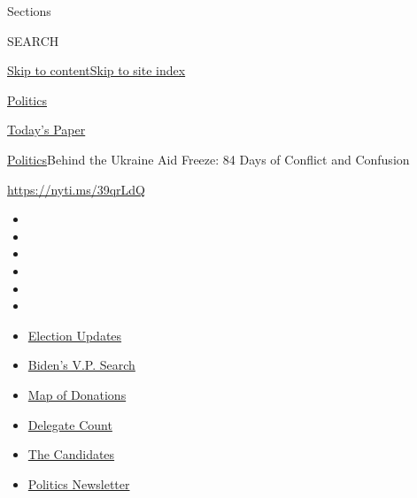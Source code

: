 Sections

SEARCH

\protect\hyperlink{site-content}{Skip to
content}\protect\hyperlink{site-index}{Skip to site index}

\href{https://www.nytimes.com/section/politics}{Politics}

\href{https://myaccount.nytimes.com/auth/login?response_type=cookie\&client_id=vi}{}

\href{https://www.nytimes.com/section/todayspaper}{Today's Paper}

\href{/section/politics}{Politics}\textbar{}Behind the Ukraine Aid
Freeze: 84 Days of Conflict and Confusion

\url{https://nyti.ms/39qrLdQ}

\begin{itemize}
\item
\item
\item
\item
\item
\item
\end{itemize}

\begin{itemize}
\item
  \href{https://www.nytimes.com/2020/07/31/us/elections/biden-vs-trump.html?action=click\&pgtype=Article\&state=default\&region=TOP_BANNER\&context=storylines_menu}{Election
  Updates}
\item
  \href{https://www.nytimes.com/article/biden-vice-president-2020.html?action=click\&pgtype=Article\&state=default\&region=TOP_BANNER\&context=storylines_menu}{Biden's
  V.P. Search}
\item
  \href{https://www.nytimes.com/interactive/2020/07/24/us/politics/trump-biden-campaign-donors.html?action=click\&pgtype=Article\&state=default\&region=TOP_BANNER\&context=storylines_menu}{Map
  of Donations}
\item
  \href{https://www.nytimes.com/interactive/2020/us/elections/delegate-count-primary-results.html?action=click\&pgtype=Article\&state=default\&region=TOP_BANNER\&context=storylines_menu}{Delegate
  Count}
\item
  \href{https://www.nytimes.com/interactive/2019/us/politics/2020-presidential-candidates.html?action=click\&pgtype=Article\&state=default\&region=TOP_BANNER\&context=storylines_menu}{The
  Candidates}
\item
  \href{https://www.nytimes.com/newsletters/politics?action=click\&pgtype=Article\&state=default\&region=TOP_BANNER\&context=storylines_menu}{Politics
  Newsletter}
\end{itemize}

